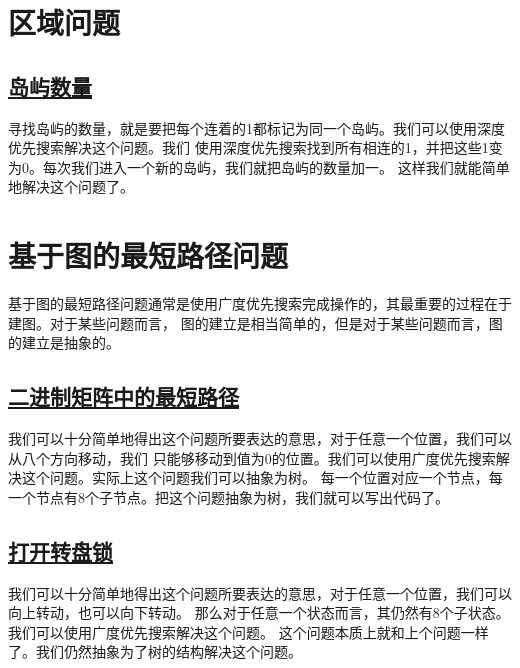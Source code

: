 \documentclass[../../main.tex]{subfiles}
\begin{document}


\section{区域问题}

\subsection{\href{https://leetcode.cn/problems/number-of-islands/}{岛屿数量}}

寻找岛屿的数量，就是要把每个连着的1都标记为同一个岛屿。我们可以使用深度优先搜索解决这个问题。我们
使用深度优先搜索找到所有相连的1，并把这些1变为0。每次我们进入一个新的岛屿，我们就把岛屿的数量加一。
这样我们就能简单地解决这个问题了。



\section{基于图的最短路径问题}

基于图的最短路径问题通常是使用广度优先搜索完成操作的，其最重要的过程在于建图。对于某些问题而言，
图的建立是相当简单的，但是对于某些问题而言，图的建立是抽象的。

\subsection{\href{https://leetcode.cn/problems/shortest-path-in-binary-matrix}{二进制矩阵中的最短路径
}}

我们可以十分简单地得出这个问题所要表达的意思，对于任意一个位置，我们可以从八个方向移动，我们
只能够移动到值为0的位置。我们可以使用广度优先搜索解决这个问题。实际上这个问题我们可以抽象为树。
每一个位置对应一个节点，每一个节点有8个子节点。把这个问题抽象为树，我们就可以写出代码了。



\subsection{\href{https://leetcode.cn/problems/open-the-lock/}{打开转盘锁}}

我们可以十分简单地得出这个问题所要表达的意思，对于任意一个位置，我们可以向上转动，也可以向下转动。
那么对于任意一个状态而言，其仍然有8个子状态。我们可以使用广度优先搜索解决这个问题。
这个问题本质上就和上个问题一样了。我们仍然抽象为了树的结构解决这个问题。
\end{document}
